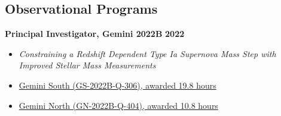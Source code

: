 \documentclass[margin]{res}
\begin{document}
\begin{resume}






\section{Observational Programs} %


{\bf Principal Investigator, Gemini 2022B} \hfill \textbf{2022} 
\begin{itemize} \itemsep -2pt %
     \item[] \textit{Constraining a Redshift Dependent Type Ia Supernova Mass Step with \\Improved Stellar Mass Measurements}
     \item[]\href{http://www.gemini.edu/observing/schedules-and-queue/2022b-gs-queue-band-1-3}{Gemini South (GS-2022B-Q-306), awarded 19.8 hours}
     \item[]\href{http://www.gemini.edu/observing/schedules-and-queue/2022b-gn-queue-band-4}{Gemini North (GN-2022B-Q-404), awarded 10.8 hours}
     \end{itemize} \vspace{-12pt}


\end{resume}
\end{document}
